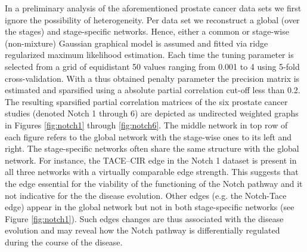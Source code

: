 \documentclass[10pt]{article}
\newcommand{\red}[1]{{\textcolor {red} {#1}}}
\begin{document}


In a preliminary analysis of the aforementioned prostate cancer data sets we first ignore the possibility of heterogeneity. Per data set we reconstruct a global (over the stages) and stage-specific networks. Hence, either a common or stage-wise (non-mixture) Gaussian graphical model is assumed and fitted via ridge regularized maximum likelihood estimation. Each time the tuning parameter is selected from a grid of equidistant 50 values ranging from 0.001 to 4 using 5-fold cross-validation. With a thus obtained penalty parameter the precision matrix is estimated and sparsified using a absolute partial correlation cut-off less than 0.2. The resulting sparsified partial correlation matrices of the six prostate cancer studies (denoted Notch 1 through 6) are depicted as undirected weighted graphs in Figures \ref{fig:notch1} through \ref{fig:notch6}. The middle network in top row of each figure refers to the global network with the stage-wise ones to its left and right. The stage-specific networks often share the same structure with the global network. For instance, the TACE--CIR edge in the Notch 1 dataset is present in all three networks with a virtually comparable edge strength. This suggests that the edge essential for the viability of the functioning of the Notch pathway and it not indicative for the the disease evolution. Other edges (e.g. the Notch-Tace edge) appear in the global network but not in both stage-specific networks (see Figure \ref{fig:notch1}). Such edges changes are thus associated with the disease evolution and may reveal how the Notch pathway is differentially regulated during the course of the disease. 
\end{document}
